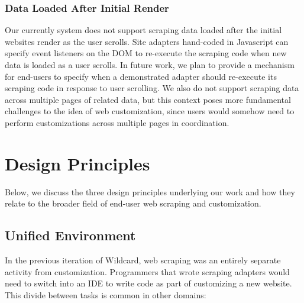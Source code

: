 \documentclass[sigconf,10pt]{acmart}
\begin{document}
\hypertarget{data-loaded-after-initial-render}{%
\subsubsection{Data Loaded After Initial
Render}\label{data-loaded-after-initial-render}}

Our currently system does not support scraping data loaded after the
initial websites render as the user scrolls. Site adapters hand-coded in
Javascript can specify event listeners on the DOM to re-execute the
scraping code when new data is loaded as a user scrolls. In future work,
we plan to provide a mechanism for end-users to specify when a
demonstrated adapter should re-execute its scraping code in response to
user scrolling. We also do not support scraping data across multiple
pages of related data, but this context poses more fundamental
challenges to the idea of web customization, since users would somehow
need to perform customizations across multiple pages in coordination.

\hypertarget{sec:design-principles}{%
\section{Design Principles}\label{sec:design-principles}}

Below, we discuss the three design principles underlying our work and
how they relate to the broader field of end-user web scraping and
customization.

\hypertarget{unified-environment}{%
\subsection{Unified Environment}\label{unified-environment}}

In the previous iteration of Wildcard, web scraping was an entirely
separate activity from customization. Programmers that wrote scraping
adapters would need to switch into an IDE to write code as part of
customizing a new website. This divide between tasks is common in other
domains:
\end{document}
